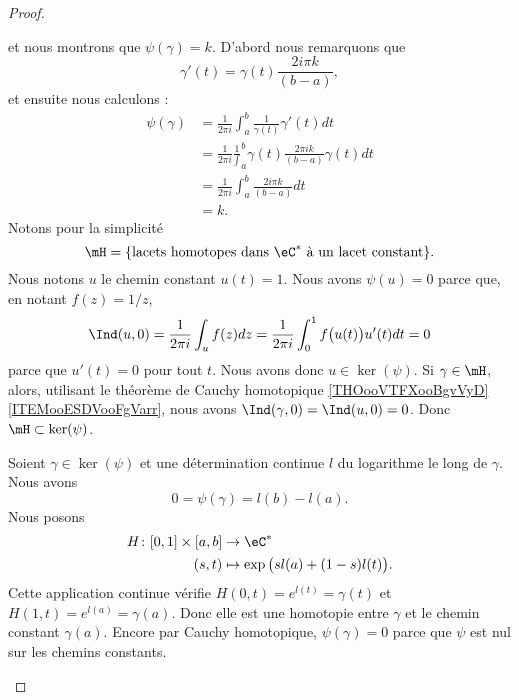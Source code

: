 \begin{proof}
\begin{subproof}
\begin{equation}
		\end{equation}
		et nous montrons que \( \psi(\gamma)=k\). D'abord nous remarquons que
		\begin{equation}
			\gamma'(t)=\gamma(t)\frac{ 2i\pi k }{ (b-a) },
		\end{equation}
		et ensuite nous calculons :
		\begin{subequations}
			\begin{align}
				\psi(\gamma) & =\frac{1}{ 2\pi i }\int_a^b\frac{1}{ \gamma(t) }\gamma'(t)dt                         \\
				             & =\frac{1}{ 2\pi i }\frac{1}\int_a^b{ \gamma(t) }\frac{ 2\pi ik }{ (b-a) }\gamma(t)dt \\
				             & =\frac{1}{ 2\pi i }\int_a^b\frac{ 2i\pi k }{ (b-a) }dt                               \\
				             & =k.
			\end{align}
		\end{subequations}
		\spitem[Noyau]
		Notons pour la simplicité
		\begin{equation}
			\mH=\{ \text{lacets homotopes dans \( \eC^*\) à un lacet constant} \}.
		\end{equation}
		Nous notons \( u\) le chemin constant \( u(t)=1\). Nous avons \( \psi(u)=0\) parce que, en notant \( f(z)=1/z\),
		\begin{equation}
			\Ind(u,0)=\frac{1}{ 2\pi i }\int_uf(z)dz=\frac{1}{ 2\pi i }\int_0^1f\big( u(t) \big)u'(t)dt=0
		\end{equation}
		parce que \( u'(t)=0\) pour tout \( t\). Nous avons donc \( u\in\ker(\psi)\). Si \( \gamma\in\mH\), alors, utilisant le théorème de Cauchy homotopique \ref{THOooVTFXooBgvVyD}\ref{ITEMooESDVooFgVarr}, nous avons \( \Ind(\gamma,0)=\Ind(u,0)=0\). Donc \( \mH\subset\ker(\psi)\).

		Soient \( \gamma\in\ker(\psi)\) et une détermination continue \( l\) du logarithme le long de \( \gamma\). Nous avons
		\begin{equation}
			0=\psi(\gamma)=l(b)-l(a).
		\end{equation}
		Nous posons
		\begin{equation}
			\begin{aligned}
				H\colon \mathopen[ 0 , 1 \mathclose]\times \mathopen[ a , b \mathclose] & \to \eC^*                                 \\
				(s,t)                                                                   & \mapsto  \exp\big( sl(a)+(1-s)l(t) \big).
			\end{aligned}
		\end{equation}
		Cette application continue vérifie \( H(0,t)= e^{l(t)}=\gamma(t)\) et \( H(1,t)= e^{l(a)}=\gamma(a)\). Donc elle est une homotopie entre \( \gamma\) et le chemin constant \( \gamma(a)\). Encore par Cauchy homotopique, \( \psi(\gamma)=0\) parce que \( \psi\) est nul sur les chemins constants.
	\end{subproof}
\end{proof}

